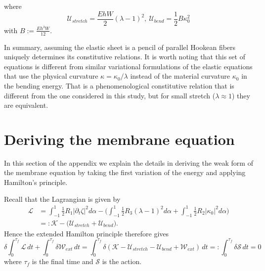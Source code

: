 \documentclass{article}[12pt]
\theoremstyle{Theorem}
\begin{document}
where \begin{equation}
    \mathcal{U}_{stretch} = \frac{EhW}{2}(\lambda-1)^2,\ \mathcal{U}_{bend}= \frac{1}{2}B\kappa_0^2
\end{equation} with $B:= \frac{Eh^3W}{12}$.
\newline

In summary, assuming the elastic sheet is a pencil of parallel Hookean fibers uniquely determines its constitutive relations. It is worth noting that this set of equations is different from similar variational formulations of the elastic equations \cite{tadjbakhsh1966variational} that use the physical curvature $\kappa = \kappa_0/\lambda$ instead of the material curvature $\kappa_0$ in the bending energy. That is a phenomenological constitutive relation that is different from the one considered in this study, but for small stretch ($\lambda \approx 1$) they are equivalent.
\section{Deriving the membrane equation}
\label{deriving membrane equation appendix}

In this section of the appendix we explain the details in deriving the weak form of the membrane equation by taking the first variation of the energy and applying Hamilton's principle.
\newline

Recall that the Lagrangian is given by
\begin{align}
\mathcal{L}&= \int_{-1}^1 \frac{1}{2}R_1 |\partial_{t} \zeta|^2d\alpha - \bigg(\int_{-1}^1\frac{1}{2}R_3(\lambda-1)^2d\alpha + \int_{-1}^{1}\frac{1}{2}R_2|\kappa_0|^2d\alpha\bigg)
\\
    &=: \mathcal{K} - \bigg(\mathcal{U}_{stretch} + \mathcal{U}_{bend}\bigg).
\end{align}
Hence the extended Hamilton principle \cite[pp.~268--272]{meirovitch2001fundamentals} therefore gives
\begin{equation}
\delta\int_0^{\tau_f}
\mathcal{L}\,dt
+
\int_0^{\tau_f}\delta\mathcal{W}_{ext}\,dt = 
\int_0^{\tau_f}
\delta\left(
\mathcal{K}
-\mathcal{U}_{stretch}
-\mathcal{U}_{bend}
+ \mathcal{W}_{ext}\right)\,dt
=: \int_0^{\tau_f}\delta\mathcal{S}\,dt =0
\label{hamilton's principle}
\end{equation}
where $\tau_f$ is the final time and $\mathcal{S}$ is the action.
\newline
\end{document}
